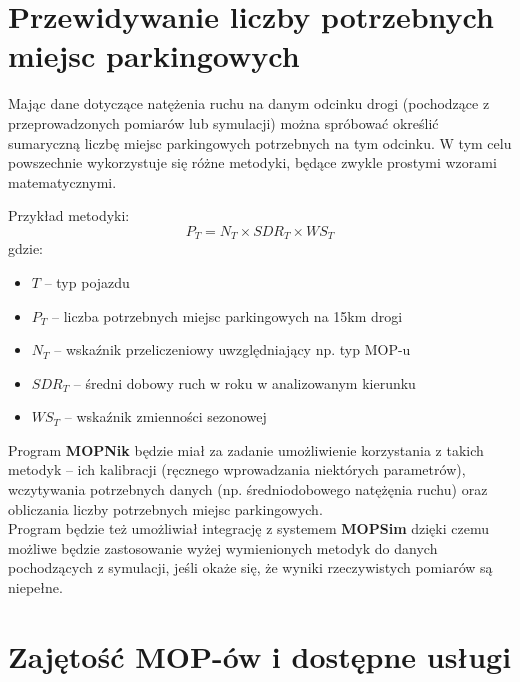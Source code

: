 \section{Przewidywanie liczby potrzebnych miejsc parkingowych}
Mając dane dotyczące natężenia ruchu na danym odcinku drogi (pochodzące z
przeprowadzonych pomiarów lub symulacji) można spróbować określić sumaryczną
liczbę miejsc parkingowych potrzebnych na tym odcinku. W tym celu powszechnie
wykorzystuje się różne metodyki, będące zwykle prostymi wzorami matematycznymi.

Przykład metodyki: 
$$ P_T = N_T \times SDR_T \times WS_T $$
gdzie:
\begin{itemize}
  \item $T$ -- typ pojazdu
  \item $P_T$ -- liczba potrzebnych miejsc parkingowych na 15km drogi
  \item $N_T$ -- wskaźnik przeliczeniowy uwzględniający np. typ MOP-u
  \item $SDR_T$ -- średni dobowy ruch w roku w analizowanym kierunku 
  \item $WS_T$ -- wskaźnik zmienności sezonowej
\end{itemize}
Program \textbf{MOPNik} będzie miał za zadanie umożliwienie korzystania z
takich metodyk -- ich kalibracji (ręcznego wprowadzania niektórych parametrów),
wczytywania potrzebnych danych (np. średniodobowego natężęnia ruchu)
oraz obliczania liczby potrzebnych miejsc parkingowych. \\
Program będzie też umożliwiał integrację z systemem \textbf{MOPSim} dzięki
czemu możliwe będzie zastosowanie wyżej wymienionych metodyk do danych
pochodzących z symulacji, jeśli okaże się, że wyniki rzeczywistych pomiarów są
niepełne. 


\section{Zajętość MOP-ów i dostępne usługi}

